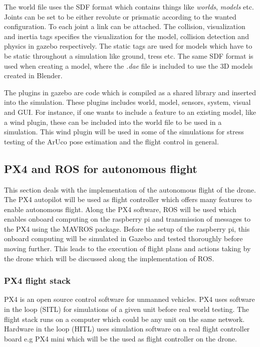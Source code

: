 \documentclass[../Head/report.tex]{subfiles}
\begin{document}
The world file uses the SDF format which contains things like \textit{worlds}, \textit{models} etc. Joints can be set to be either revolute or prismatic according to the wanted configuration. To each joint a link can be attached. The collision, visualization and inertia tags specifies the visualization for the model, collision detection and physics in gazebo respectively. The static tags are used for models which have to be static throughout a simulation like ground, tress etc. The same SDF format is used when creating a model, where the \textit{.dae} file is included to use the 3D models created in Blender.  

The plugins in gazebo are code which is compiled as a shared library and inserted into the simulation. These plugins includes world, model, sensors, system, visual and GUI. For instance, if one wants to include a feature to an existing model, like a wind plugin, these can be included into the world file to be used in a simulation. This wind plugin will be used in some of the simulations for stress testing of the ArUco pose estimation and the flight control in general. 

\subsection{PX4 and ROS for autonomous flight}

This section deals with the implementation of the autonomous flight of the drone. The PX4 autopilot will be used as flight controller which offers many features to enable autonomous flight. Along the PX4 software, ROS will be used which enables onboard computing on the raspberry pi and transmission of messages to the PX4 using the MAVROS package. Before the setup of the raspberry pi, this onboard computing will be simulated in Gazebo and tested thoroughly before moving further. This leads to the execution of flight plans and actions taking by the drone which will be discussed along the implementation of ROS. 

\subsubsection{PX4 flight stack}
\label{sec:px4_flight_stack}

PX4 is an open source control software for unmanned vehicles. PX4 uses software in the loop (SITL) for simulations of a given unit before real world testing. The flight stack runs on a computer which could be any unit on the same network. Hardware in the loop (HITL) uses simulation software on a real flight controller board e.g PX4 mini which will be the used as flight controller on the drone. 
\end{document}
